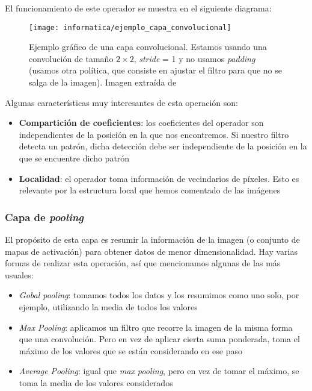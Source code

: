 El funcionamiento de este operador se muestra en el siguiente diagrama:

\begin{figure}[H]
    \centering
    \texttt{[image: informatica/ejemplo\_capa\_convolucional]}
    \caption{Ejemplo gráfico de una capa convolucional. Estamos usando una convolución de tamaño $2 \times 2$, \textit{stride} = 1 y no usamos \textit{padding} (usamos otra política, que consiste en ajustar el filtro para que no se salga de la imagen). Imagen extraída de \cite{informatica:paper_definicion_cnn}}
\end{figure}

Algunas características muy interesantes de esta operación son:

\begin{itemize}
    \item \textbf{Compartición de coeficientes}: los coeficientes del operador son independientes de la posición en la que nos encontremos. Si nuestro filtro detecta un patrón, dicha detección debe ser independiente de la posición en la que se encuentre dicho patrón
    \item \textbf{Localidad}: el operador toma información de vecindarios de píxeles. Esto es relevante por la estructura local que hemos comentado de las imágenes
\end{itemize}

\subsubsection{Capa de \textit{pooling}}

El propósito de esta capa es resumir la información de la imagen (o conjunto de mapas de activación) para obtener datos de menor dimensionalidad. Hay varias formas de realizar esta operación, así que mencionamos algunas de las más usuales:

\begin{itemize}
    \item \textit{Gobal pooling}: tomamos todos los datos y los resumimos como uno solo, por ejemplo, utilizando la media de todos los valores
    \item \textit{Max Pooling}: aplicamos un filtro que recorre la imagen de la misma forma que una convolución. Pero en vez de aplicar cierta suma ponderada, toma el máximo de los valores que se están considerando en ese paso
    \item \textit{Average Pooling}: igual que \textit{max pooling}, pero en vez de tomar el máximo, se toma la media de los valores considerados
\end{itemize}

